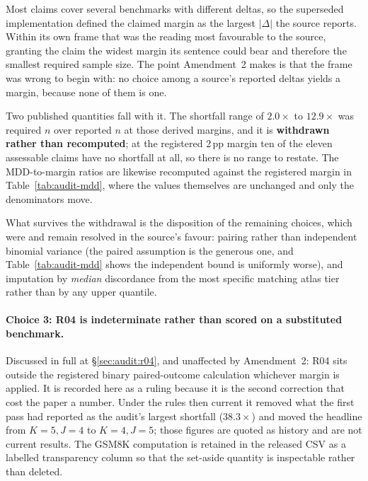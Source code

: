 Most claims cover several benchmarks with different deltas, so the superseded
implementation defined the claimed margin as the largest $|\Delta|$ the source
reports. Within its own frame that was the reading most favourable to the
source, granting the claim the widest margin its sentence could bear and
therefore the smallest required sample size. The point Amendment~2 makes is that
the frame was wrong to begin with: no choice among a source's reported deltas
yields a margin, because none of them is one.

Two published quantities fall with it. The shortfall range of $2.0\times$ to
$12.9\times$ was required $n$ over reported $n$ at those derived margins, and it
is \textbf{withdrawn rather than recomputed}; at the registered 2\,pp margin ten
of the eleven assessable claims have no shortfall at all, so there is no range
to restate. The MDD-to-margin ratios are likewise recomputed against the
registered margin in Table~\ref{tab:audit-mdd}, where the values themselves are
unchanged and only the denominators move.

What survives the withdrawal is the disposition of the remaining choices, which
were and remain resolved in the source's favour: pairing rather than independent
binomial variance (the paired assumption is the generous one, and
Table~\ref{tab:audit-mdd} shows the independent bound is uniformly worse), and
imputation by \emph{median} discordance from the most specific matching atlas
tier rather than by any upper quantile.

\paragraph{Choice 3: R04 is indeterminate rather than scored on a substituted
benchmark.}
Discussed in full at \S\ref{sec:audit:r04}, and unaffected by Amendment~2: R04
sits outside the registered binary paired-outcome calculation whichever margin
is applied. It is recorded here as a ruling because it is the second correction
that cost the paper a number. Under the rules then current it removed what the
first pass had reported as the audit's largest shortfall ($38.3\times$) and
moved the headline from $K = 5, J = 4$ to $K = 4, J = 5$; those figures are
quoted as history and are not current results. The GSM8K computation is retained
in the released CSV as a labelled transparency column so that the set-aside
quantity is inspectable rather than deleted.

